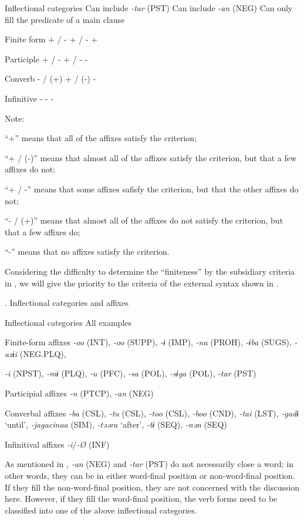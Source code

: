 Inflectional categories  Can include \textit{{}-tar} (PST)  Can include \textit{{}-an} (NEG)  Can only fill the predicate of a main clause

Finite form  + / -  + / -  +

Participle  + / -  + / -  {}-

Converb  {}- / (+)  + / (-)  {}-

Infinitive  {}-  {}-  {}-

Note:

  “+” means that all of the affixes satisfy the criterion;

“+ / (-)” means that almost all of the affixes satisfy the criterion, but that a few affixes do not;

“+ / -” means that some affixes safisfy the criterion, but that the other affixes do not;

“- / (+)” means that almost all of the affixes do not satisfy the criterion, but that a few affixes do;

“-” means that no affixes satisfy the criterion.

Considering the difficulty to determine the “finiteness” by the subsidiary criteria in , we will give the priority to the criteria of the external syntax shown in .

\begin{styleBeschriftung}
\textmd{. Inflectional categories and affixes}
\end{styleBeschriftung}

Inflectional categories  All examples

Finite-form affixes  \textit{{}-oo} (INT), \textit{{}-oo} (SUPP), \textit{{}-ɨ} (IMP), \textit{{}-na} (PROH), \textit{{}-ɨba} (SUGS), \textit{{}-azɨi} (NEG.PLQ),

\textit{{}-i} (NPST), \textit{{}-mɨ} (PLQ), \textit{{}-u} (PFC), \textit{{}-sa} (POL), \textit{{}-sɨga} (POL), \textit{{}-tar} (PST)

Participial affixes  \textit{{}-n} (PTCP), \textit{{}-an} (NEG)

Converbal affixes  \textit{{}-ba} (CSL), \textit{{}-tu} (CSL), \textit{{}-too} (CSL), \textit{{}-boo} (CND), \textit{{}-tai} (LST), \textit{{}-gadɨ} ‘until’, \textit{{}-jagacinaa} (SIM), \textit{{}-təəra} ‘after’, \textit{{}-tɨ} (SEQ), \textit{{}-nən} (SEQ)

Infinitival affixes  \textit{{}-i}/\textit{{}-Ø} (INF)

As mentioned in , \textit{{}-an} (NEG) and \textit{{}-tar} (PST) do not necessarily close a word; in other words, they can be in either word-final position or non-word-final position. If they fill the non-word-final position, they are not concerned with the discussion here. However, if they fill the word-final position, the verb forms need to be classified into one of the above inflectional categories.

